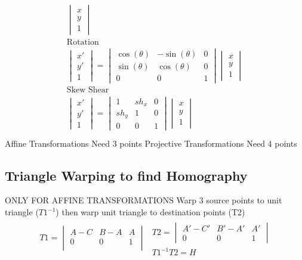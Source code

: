\documentclass[8pt, english]{article}
\begin{document}
\begin{multicols}{3}
\begin{align*}
\begin{split}
\begin{vmatrix}
x \\y \\ 1
\end{vmatrix} \\ 
\text{Rotation} \\ 
\begin{vmatrix}
x' \\ y' \\ 1
\end{vmatrix} = \begin{vmatrix}
 \cos(\theta) & -\sin(\theta)  & 0\\ \sin(\theta) & \cos(\theta) & 0 \\ 0 & 0 & 1
\end{vmatrix} \begin{vmatrix}
x \\y \\ 1
\end{vmatrix} \\  
\text{Skew \ Shear} \\ 
\begin{vmatrix}
x' \\ y' \\ 1
\end{vmatrix} = \begin{vmatrix}
 1 & sh_x  & 0\\ sh_y & 1 & 0 \\ 0 & 0 & 1
\end{vmatrix} \begin{vmatrix}
x \\y \\ 1
\end{vmatrix} \\ 
\end{split}
\end{align*}
Affine Transformations Need 3 points 
Projective Transformations Need 4 points
\subsection*{Triangle Warping to find Homography}
ONLY FOR AFFINE TRANSFORMATIONS
Warp 3 source points to unit triangle ($T1^{-1}$)  then warp unit triangle to destination points (T2) 
\begin{align*}
\begin{split}
T1 = \begin{vmatrix}
A - C &  B - A &  A \\ 
0 & 0 & 1\\
\end{vmatrix} \\ 
\end{split}
\begin{split}
T2= \begin{vmatrix}
A' - C' & B' - A' & A' \\ 
0&0&1
\end{vmatrix} \\
T1^{-1}T2 = H\\
\end{split}
\end{align*}

\end{multicols}
\end{document}

